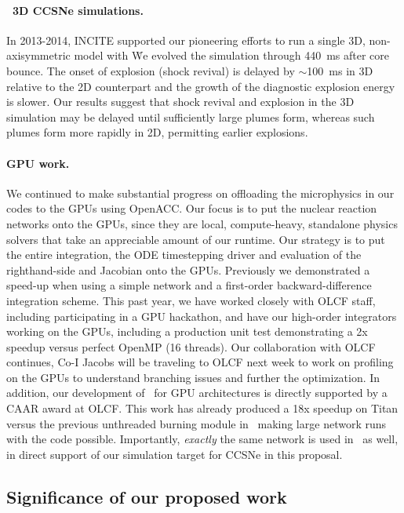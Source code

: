 \documentclass[11pt,letterpaper,english]{article}
\begin{document}
\paragraph{\chimera\ 3D CCSNe simulations.}

In 2013-2014, INCITE supported our pioneering efforts to run a single 3D, non-axisymmetric model with \chimera\. We evolved the simulation through 440~ms after core bounce.
The onset of explosion (shock revival) is delayed by $\sim$100~ms in 3D relative to the 2D counterpart and the growth of the diagnostic explosion energy is slower. Our results suggest
 that shock revival and explosion in the 3D simulation may be delayed until sufficiently large plumes form, whereas such plumes form more rapidly in 2D, permitting earlier explosions.

\paragraph{GPU work.}
%
We continued to make substantial progress on offloading the
microphysics in our codes to the GPUs using OpenACC.  Our focus is to
put the nuclear reaction networks onto the GPUs, since they are local,
compute-heavy, standalone physics solvers that take an appreciable
amount of our runtime. Our strategy is to put the entire integration,
the ODE timestepping driver and evaluation of the righthand-side and
Jacobian onto the GPUs.  Previously we demonstrated a speed-up when
using a simple network and a first-order backward-difference
integration scheme.  This past year, we have worked closely with OLCF
staff, including participating in a GPU hackathon, and have our
high-order integrators working on the GPUs, including a production unit test
demonstrating a 2x speedup versus perfect OpenMP (16 threads).  Our collaboration
with OLCF continues, Co-I Jacobs will be traveling to OLCF next week
to work on profiling on the GPUs to understand branching issues and
further the optimization.  In addition, our development of \flash\ for GPU architectures is 
directly supported by a CAAR award at OLCF. This work has already produced a 18x speedup 
on Titan versus the previous unthreaded burning module in \flash\, making large network
runs with the code possible. Importantly, {\it exactly} the same network is used in \chimera\ as well, 
in direct support of our simulation target for CCSNe in this proposal. 

\subsection{Significance of our proposed work}
\end{document}
